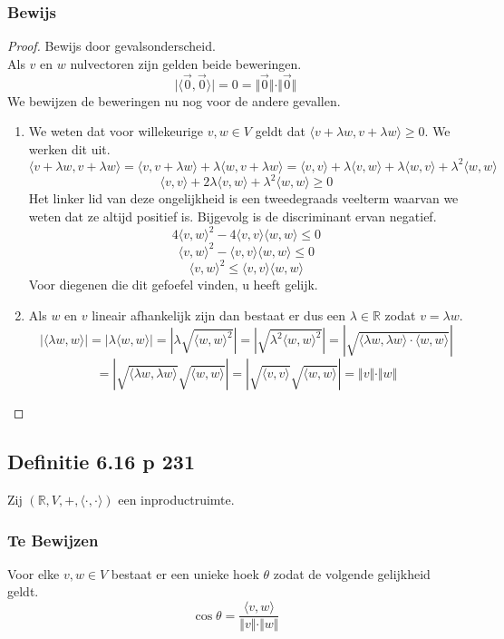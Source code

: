 \documentclass[lineaire_algebra_oplossingen.tex]{subfiles}
\begin{document}
\subsubsection*{Bewijs}
\begin{proof}
Bewijs door gevalsonderscheid.\\
Als $v$ en $w$ nulvectoren zijn gelden beide beweringen.
\[
\vert\langle \vec{0},\vec{0}\rangle\vert =0= \Vert \vec{0}\Vert\cdot \Vert \vec{0}\Vert
\]
We bewijzen de beweringen nu nog voor de andere gevallen.

\begin{enumerate}
\item
We weten dat voor willekeurige $v,w\in V$ geldt dat $\langle v + \lambda w,v+\lambda w\rangle \ge 0$. We werken dit uit.
\[
\langle v + \lambda w,v+\lambda w\rangle = \langle v,v+\lambda w \rangle + \lambda \langle w,v+\lambda w\rangle = \langle v,v \rangle + \lambda \langle v,w \rangle + \lambda \langle w,v\rangle + \lambda^2\langle w,w\rangle
\]
\[
\langle v,v \rangle + 2\lambda \langle v,w \rangle + \lambda^2\langle w,w\rangle \ge 0
\]
Het linker lid van deze ongelijkheid is een tweedegraads veelterm waarvan we weten dat ze altijd positief is. Bijgevolg is de discriminant ervan negatief.
\[
4\langle v,w\rangle^2-4\langle v,v\rangle\langle w,w\rangle \le 0
\]
\[
\langle v,w\rangle^2-\langle v,v\rangle\langle w,w\rangle \le 0
\]
\[
\langle v,w\rangle^2 \le \langle v,v\rangle\langle w,w\rangle 
\]
Voor diegenen die dit gefoefel vinden, u heeft gelijk.

\item
Als $w$ en $v$ lineair afhankelijk zijn dan bestaat er dus een $\lambda\in\mathbb{R}$ zodat $v=\lambda w$.
\[
|\langle \lambda w, w \rangle| = |\lambda  \langle w, w \rangle| = |\lambda\sqrt{\langle w, w \rangle^2}| = |\sqrt{\lambda^2\langle w, w \rangle^2}| = |\sqrt{\langle \lambda w, \lambda w \rangle \cdot \langle w, w \rangle }| \]
\[
= |\sqrt{\langle \lambda w, \lambda w \rangle} \sqrt{\langle w, w \rangle }| = |\sqrt{\langle v, v \rangle} \sqrt{\langle w, w \rangle }| = \Vert v\Vert\cdot \Vert w\Vert
\]
\end{enumerate}
\end{proof}

\subsection{Definitie 6.16 p 231}
Zij $(\mathbb{R},V,+,\langle\cdot,\cdot\rangle)$ een inproductruimte.
\subsubsection*{Te Bewijzen}
Voor elke $v,w\in V$ bestaat er een unieke hoek $\theta$ zodat de volgende gelijkheid geldt.
\[
\cos\theta = \frac{\langle v,w\rangle}{\Vert v\Vert\cdot \Vert w\Vert}
\]
\end{document}
